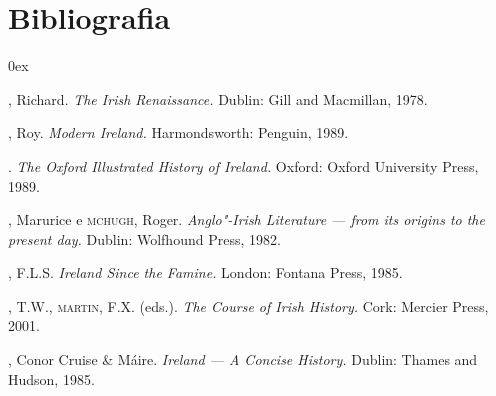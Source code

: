 \section{Bibliografia}

\begin{description}0ex
\newcommand{\tit}[1]{\item[\textnormal{\textsc{\MakeTextLowercase{#1}}}]}
\newcommand{\titidem}{\item[\line(1,0){25}]}

\tit{FALLIS}, Richard. \textit{The Irish Renaissance.} Dublin: Gill and
Macmillan, 1978.

\tit{FOSTER}, Roy. \textit{Modern Ireland.} Harmondsworth: Penguin, 1989. 

\titidem. \textit{The Oxford Illustrated History of Ireland.} Oxford:
Oxford University Press, 1989.

\tit{HARMON}, Marurice e \textsc{mchugh}, Roger. \textit{Anglo"-Irish Literature --- from
its origins to the present day.} Dublin: Wolfhound Press, 1982.

\tit{LYONS}, F.L.S. \textit{Ireland Since the Famine.} London: Fontana
Press, 1985.

\tit{MOODY}, T.W., \textsc{martin}, F.X. (eds.). \textit{The Course of Irish History.}
Cork: Mercier Press, 2001.

\tit{O’BRIEN}, Conor Cruise \& Máire. \textit{Ireland --- A Concise History.}
Dublin: Thames and Hudson, 1985.

\end{description}

